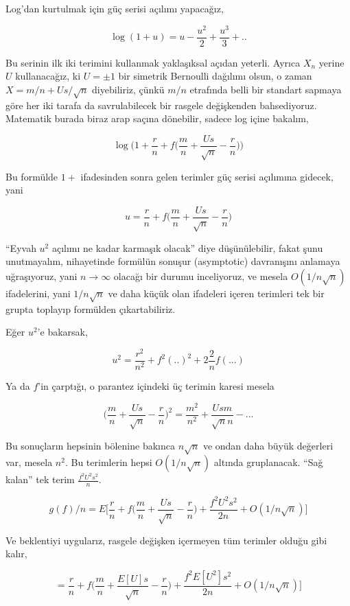 \documentclass[12pt,fleqn]{article}\usepackage{../../common}
\begin{document}
Log'dan kurtulmak için güç serisi açılımı yapacağız, 

$$ \log(1+u) = u - \frac{u^2}{2} + \frac{u^3}{3} + .. $$

Bu serinin ilk iki terimini kullanmak yaklaşıksal açıdan yeterli. Ayrıca
$X_n$ yerine $U$ kullanacağız, ki $U = \pm 1 $ bir simetrik Bernoulli
dağılımı olsun, o zaman $X = m/n + U s/\sqrt{n}$ diyebiliriz, çünkü $m/n$
etrafında belli bir standart sapmaya göre her iki tarafa da savrulabilecek
bir rasgele değişkenden bahsediyoruz. Matematik burada biraz arap saçına
dönebilir, sadece log içine bakalım,

$$ \log \bigg( 
1 + \frac{r}{n} + f \big( \frac{m}{n} + \frac{Us}{\sqrt{n}} - \frac{r}{n} \big) 
\bigg)  $$

Bu formülde $1+$ ifadesinden sonra gelen terimler güç serisi açılımına
gidecek, yani 

$$ u = \frac{r}{n} + f \big( \frac{m}{n} + \frac{Us}{\sqrt{n}} - \frac{r}{n} \big)  $$

``Eyvah $u^2$ açılımı ne kadar karmaşık olacak'' diye düşünülebilir, fakat
şunu unutmayalım, nihayetinde formülün sonuşur (asymptotic) davranışını
anlamaya uğraşıyoruz, yani $n \to \infty$ olacağı bir durumu inceliyoruz,
ve mesela $O(1/n \sqrt{n})$ ifadelerini, yani $1/n \sqrt{n}$ ve daha küçük
olan ifadeleri içeren terimleri tek bir grupta toplayıp formülden
çıkartabiliriz. 

Eğer $u^2$'e bakarsak, 

$$ u^2 = \frac{r^2}{n^2} + f^2(..)^2 + 2 \frac{2}{n}f(...) $$

Ya da $f$'in çarptığı, o parantez içindeki üç terimin karesi mesela

$$ \big( \frac{m}{n} + \frac{Us}{\sqrt{n}} - \frac{r}{n} \big)^2 
= \frac{m^2}{n^2} + \frac{Usm}{\sqrt{n}n} - ...
$$

Bu sonuçların hepsinin bölenine bakınca $n\sqrt{n}$ ve ondan daha büyük
değerleri var, mesela $n^2$. Bu terimlerin hepsi $O(1/n \sqrt{n})$ altında
gruplanacak. ``Sağ kalan'' tek terim $\frac{f^2U^2s^2}{n}$. 

$$ 
g(f)/n = 
E\big[
\frac{r}{n} + f \big( \frac{m}{n} + \frac{Us}{\sqrt{n}} - \frac{r}{n} \big) + 
\frac{f^2U^2s^2}{2n} + 
O(1/n \sqrt{n})
\big]
$$

Ve beklentiyi uygularız, rasgele değişken içermeyen tüm terimler olduğu
gibi kalır, 

$$ 
= \frac{r}{n} + f \big( \frac{m}{n} + \frac{E[U]s}{\sqrt{n}} - \frac{r}{n} \big) + 
\frac{f^2E[U^2]s^2}{2n} + 
O(1/n \sqrt{n})
\big]
$$
\end{document}
